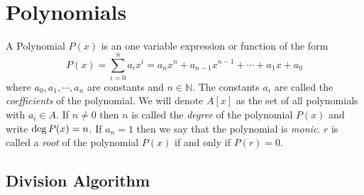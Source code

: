 \chapter{Polynomials}

\begin{definition}
    A Polynomial $P(x)$ is an one variable expression or function of the form
    \[
        P(x) = \sum_{i=0}^{n} a_{i}x^{i} = a_{n}x^{n} + a_{n-1}x^{n-1} + \cdots +a_{1}x + a_{0}
    \]
    where $a_{0},a_{1}, \cdots, a_{n}$ are constants and $n \in \mathbb{N}$. The constants $a_{i}$ are called the 
    \textit{coefficients} of the polynomial. We will denote $A[x]$ as the set of all polynomials with $a_{i} \in A$. If 
    $n\neq 0$ then $n$ is called the \textit{degree} of the polynomial $P(x)$ and write $\operatorname{deg} P(x)=n$. 
    If $a_{n} = 1$ then we say that the polynomial is \textit{monic}. 
    $r$ is called a \textit{root} of the polynomial $P(x)$ if and only if $P(r)=0$.
\end{definition}

\section{Division Algorithm}


